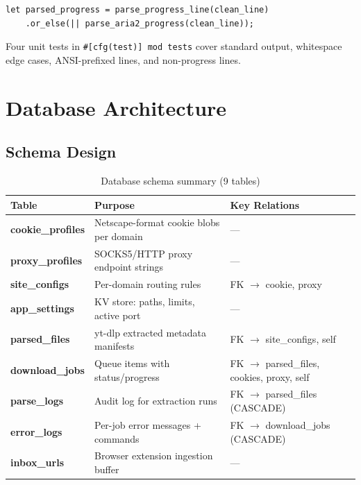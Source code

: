 \documentclass[10pt,letterpaper]{article}
\begin{document}
\begin{lstlisting}[caption={Dual-parser chaining (engine/process.rs)}]
let parsed_progress = parse_progress_line(clean_line)
    .or_else(|| parse_aria2_progress(clean_line));
\end{lstlisting}

Four unit tests in \texttt{\#[cfg(test)] mod tests} cover standard output, whitespace
edge cases, ANSI-prefixed lines, and non-progress lines.

\section{Database Architecture}

\subsection{Schema Design}

\begin{table}[H]
\centering\small
\renewcommand{\arraystretch}{1.35}
\begin{tabularx}{\linewidth}{>{\bfseries\sffamily}lXl}
\toprule
Table & Purpose & Key Relations \\
\midrule
cookie\_profiles & Netscape-format cookie blobs per domain & --- \\
proxy\_profiles & SOCKS5/HTTP proxy endpoint strings & --- \\
site\_configs & Per-domain routing rules & FK $\to$ cookie, proxy \\
app\_settings & KV store: paths, limits, active port & --- \\
parsed\_files & yt-dlp extracted metadata manifests & FK $\to$ site\_configs, self \\
download\_jobs & Queue items with status/progress & FK $\to$ parsed\_files, cookies, proxy, self \\
parse\_logs & Audit log for extraction runs & FK $\to$ parsed\_files (CASCADE) \\
error\_logs & Per-job error messages + commands & FK $\to$ download\_jobs (CASCADE) \\
inbox\_urls & Browser extension ingestion buffer & --- \\
\bottomrule
\end{tabularx}
\caption{Database schema summary (9 tables)}
\end{table}
\end{document}
